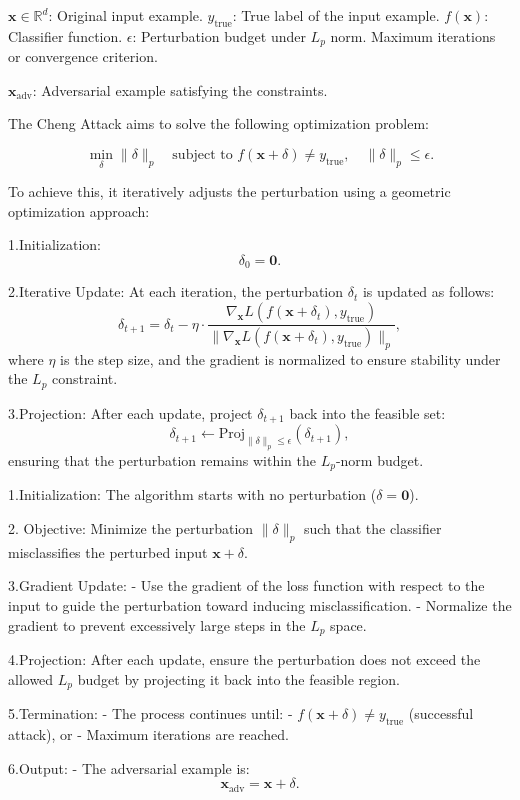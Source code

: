 $\mathbf{x} \in \mathbb{R}^d$: Original input example.
$y_{\text{true}}$: True label of the input example.
$f(\mathbf{x})$: Classifier function.
$\epsilon$: Perturbation budget under $L_p$ norm.
Maximum iterations or convergence criterion.

$\mathbf{x}_{\text{adv}}$: Adversarial example satisfying the constraints.

The Cheng Attack aims to solve the following optimization problem:

\[
\min_{\delta} \|\delta\|_p \quad \text{subject to } f(\mathbf{x} + \delta) \neq y_{\text{true}}, \quad \|\delta\|_p \leq \epsilon.
\]

To achieve this, it iteratively adjusts the perturbation using a geometric optimization approach:

1.Initialization:
   \[
   \delta_0 = \mathbf{0}.
   \]

2.Iterative Update:
   At each iteration, the perturbation $\delta_t$ is updated as follows:
   \[
   \delta_{t+1} = \delta_t - \eta \cdot \frac{\nabla_{\mathbf{x}} L(f(\mathbf{x} + \delta_t), y_{\text{true}})}{\|\nabla_{\mathbf{x}} L(f(\mathbf{x} + \delta_t), y_{\text{true}})\|_p},
   \]
   where $\eta$ is the step size, and the gradient is normalized to ensure stability under the $L_p$ constraint.

3.Projection:
   After each update, project $\delta_{t+1}$ back into the feasible set:
   \[
   \delta_{t+1} \gets \text{Proj}_{\|\delta\|_p \leq \epsilon} (\delta_{t+1}),
   \]
   ensuring that the perturbation remains within the $L_p$-norm budget.


1.Initialization: The algorithm starts with no perturbation ($\delta = \mathbf{0}$).

2. Objective: Minimize the perturbation $\|\delta\|_p$ such that the classifier misclassifies the perturbed input $\mathbf{x} + \delta$.

3.Gradient Update:
   - Use the gradient of the loss function with respect to the input to guide the perturbation toward inducing misclassification. 
   - Normalize the gradient to prevent excessively large steps in the $L_p$ space.

4.Projection: After each update, ensure the perturbation does not exceed the allowed $L_p$ budget by projecting it back into the feasible region.

5.Termination:
   - The process continues until:
     - $f(\mathbf{x} + \delta) \neq y_{\text{true}}$ (successful attack), or
     - Maximum iterations are reached.

6.Output:
   - The adversarial example is:
     \[
     \mathbf{x}_{\text{adv}} = \mathbf{x} + \delta.
     \]